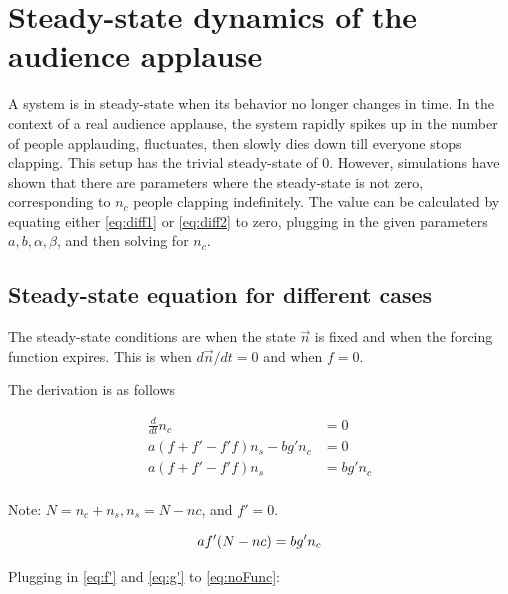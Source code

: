 \chapter{Steady-state dynamics of the audience applause}
\label{chap3}
\def\statepsi{\mid \psi \; \rangle}
\def\energy{\mid E_{\vec{k}} \; \rangle}
\def\psixt{\mid \psi(x,t) \; \rangle}
\def\statepsixtrev{\mid \psi(x,t=T_{rev}) \; \rangle}
\def\statepsixt0{\mid \psi(x,t=0) \; \rangle}
\def\lowering{S^-_l \mid 0 \; \rangle}
\def\loweringa{S^-_m \; S^-_l \mid 0 \; \rangle}

\hspace{\parindent} A system is in steady-state when its behavior no longer changes in time. In the context of a real audience applause, the system rapidly spikes up in the number of people applauding, fluctuates, then slowly dies down till everyone stops clapping. This setup has the trivial steady-state of $0$.
However, simulations have shown that there are parameters where the steady-state is not zero, corresponding to $n_{c}$ people clapping indefinitely.
The value can be calculated by equating either \eqref{eq:diff1} or \eqref{eq:diff2} to zero, plugging in the given parameters $a, b, \alpha, \beta$, and then solving for $n_{c}$.

\section{Steady-state equation for different cases}

\hspace{\parindent} The steady-state conditions are when the state $\vec{n}$ is fixed and when the forcing function expires. 
This is when $d\vec{n}/dt = 0$ and when $f=0$.

The derivation is as follows


\begin{align}
\frac{d}{dt}n_{c} & = 0\\
a(f+f'-f'f)n_{s} - bg'n_{c} & = 0\\
a(f+f'-f'f)n_{s} & = bg'n_{c} \\
\end{align}

Note: $N = n_{c} + n_{s}, n_{s} = N - n{c}$, and $f' = 0$.

\begin{equation}
af'(N - n{c}) = bg'n_{c} \\
\label{eq:noFunc}
\end{equation}

Plugging in \eqref{eq:f'} and \eqref{eq:g'} to \eqref{eq:noFunc}:

